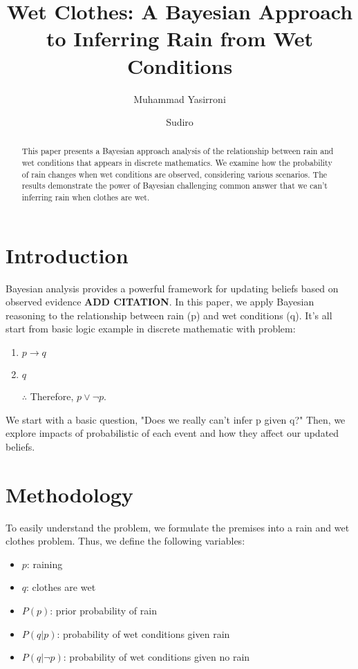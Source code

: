 \documentclass[10pt,a4paper]{article}
\title{Wet Clothes: A Bayesian Approach to Inferring Rain from Wet Conditions}
\author{Muhammad Yasirroni \and Sudiro}
\date{}
\begin{document}
\maketitle

\begin{abstract}
This paper presents a Bayesian approach analysis of the relationship between rain and wet conditions that appears in discrete mathematics. We examine how the probability of rain changes when wet conditions are observed, considering various scenarios. The results demonstrate the power of Bayesian challenging common answer that we can't inferring rain when clothes are wet.
\end{abstract}

\section{Introduction}
Bayesian analysis provides a powerful framework for updating beliefs based on observed evidence \textbf{ADD CITATION}. In this paper, we apply Bayesian reasoning to the relationship between rain (p) and wet conditions (q). It's all start from basic logic example in discrete mathematic with problem:

\begin{enumerate}
    \item $p \rightarrow q$
    \item $q$
    \item[$\therefore$] Therefore, $p \vee \neg p$.
\end{enumerate}

We start with a basic question, "Does we really can't infer p given q?" Then, we explore impacts of probabilistic of each event and how they affect our updated beliefs.

\section{Methodology}

To easily understand the problem, we formulate the premises into a rain and wet clothes problem. Thus, we define the following variables:

\begin{itemize}
    \item $p$: raining
    \item $q$: clothes are wet
    \item $P(p)$: prior probability of rain
    \item $P(q|p)$: probability of wet conditions given rain
    \item $P(q|\neg p)$: probability of wet conditions given no rain
\end{itemize}
\end{document}
